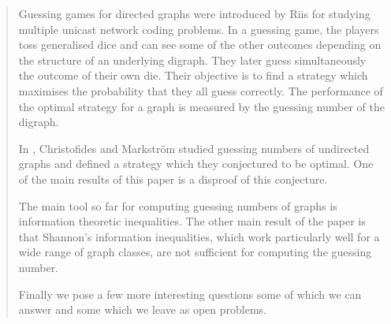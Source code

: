 \documentclass[a4paper, 14pt]{extarticle}
\theoremstyle{plain}
\begin{document}
\begin{abstract}
Guessing games for directed graphs were introduced by Riis \cite{Riis07} for studying multiple unicast network coding problems. In a guessing game, the players toss generalised dice and can see some of the other outcomes depending on the structure of an underlying digraph. They later guess simultaneously the outcome of their own die. Their objective is to find a strategy which maximises the probability that they all guess correctly. The performance of the optimal strategy for a  graph is measured by the guessing number of the digraph.




In \cite{Christofides&Markstrom11}, Christofides and Markstr\"om studied guessing numbers of undirected graphs and defined a strategy which they conjectured to be optimal. One of the main results of this paper is a disproof of this conjecture. 

The main tool so far for computing guessing numbers of graphs is information theoretic inequalities. The other main result of the paper is that Shannon's information inequalities, which work particularly well for a wide range of graph classes, are not sufficient for computing the guessing number.


Finally we pose a few more interesting questions some of which we can answer and some which we leave as open problems.


\end{abstract}
\end{document}
